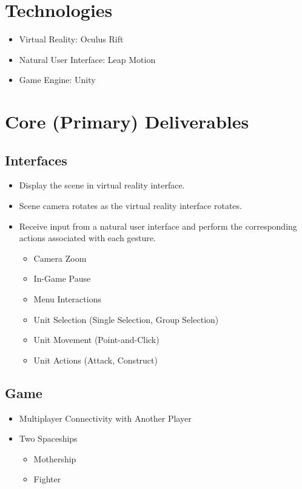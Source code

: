 \section{Technologies}

\begin{itemize}
	\item Virtual Reality: Oculus Rift
	\item Natural User Interface: Leap Motion
	\item Game Engine: Unity
\end{itemize}

\pagebreak

\section{Core (Primary) Deliverables}

\subsection{Interfaces}

\begin{itemize}
	\item Display the scene in virtual reality interface.
	\item Scene camera rotates as the virtual reality interface rotates.
	\item Receive input from a natural user interface and perform the corresponding actions associated with each gesture.
	\begin{itemize}
		\item Camera Zoom
		\item In-Game Pause
		\item Menu Interactions
		\item Unit Selection (Single Selection, Group Selection)
		\item Unit Movement (Point-and-Click)
		\item Unit Actions (Attack, Construct)
	\end{itemize}
\end{itemize}

\subsection{Game}

\begin{itemize}
	\item Multiplayer Connectivity with Another Player
	\item Two Spaceships
	\begin{itemize}
		\item Mothership
		\item Fighter
	\end{itemize}
\end{itemize}

